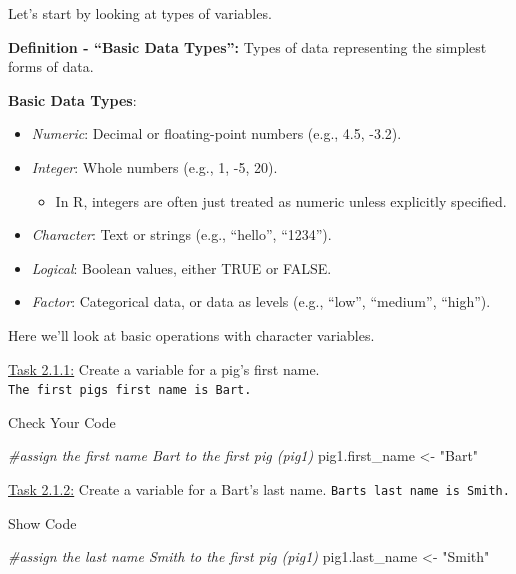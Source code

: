 \documentclass[
]{article}
\newenvironment{Shaded}{\begin{snugshade}}{\end{snugshade}}
\newcommand{\CommentTok}[1]{\textcolor[rgb]{0.56,0.35,0.01}{\textit{#1}}}
\newcommand{\NormalTok}[1]{#1}
\newcommand{\OtherTok}[1]{\textcolor[rgb]{0.56,0.35,0.01}{#1}}
\newcommand{\StringTok}[1]{\textcolor[rgb]{0.31,0.60,0.02}{#1}}
\providecommand{\tightlist}{%
  \setlength{\itemsep}{0pt}\setlength{\parskip}{0pt}}
\begin{document}
Let's start by looking at types of variables.

\textbf{Definition - ``Basic Data Types'':} Types of data representing
the simplest forms of data.

\textbf{Basic Data Types}:

\begin{itemize}
\tightlist
\item
  \emph{Numeric}: Decimal or floating-point numbers (e.g., 4.5, -3.2).
\item
  \emph{Integer}: Whole numbers (e.g., 1, -5, 20).

  \begin{itemize}
  \tightlist
  \item
    In R, integers are often just treated as numeric unless explicitly
    specified.
  \end{itemize}
\item
  \emph{Character}: Text or strings (e.g., ``hello'', ``1234'').
\item
  \emph{Logical}: Boolean values, either TRUE or FALSE.
\item
  \emph{Factor}: Categorical data, or data as levels (e.g., ``low'',
  ``medium'', ``high'').
\end{itemize}

Here we'll look at basic operations with character variables.

\ul{Task 2.1.1:} Create a variable for a pig's first name. \textbar{}
\texttt{The\ first\ pig\textquotesingle{}s\ first\ name\ is\ \textquotesingle{}Bart\textquotesingle{}.}

Check Your Code

\begin{Shaded}
\begin{Highlighting}[]
\CommentTok{\#assign the first name \textquotesingle{}Bart\textquotesingle{} to the first pig (pig1)}
\NormalTok{pig1.first\_name }\OtherTok{\textless{}{-}} \StringTok{"Bart"}
\end{Highlighting}
\end{Shaded}

\ul{Task 2.1.2:} Create a variable for a Bart's last name. \textbar{}
\texttt{Bart\textquotesingle{}s\ last\ name\ is\ \textquotesingle{}Smith\textquotesingle{}.}

Show Code

\begin{Shaded}
\begin{Highlighting}[]
\CommentTok{\#assign the last name \textquotesingle{}Smith\textquotesingle{} to the first pig (pig1)}
\NormalTok{pig1.last\_name }\OtherTok{\textless{}{-}} \StringTok{"Smith"}
\end{Highlighting}
\end{Shaded}
\end{document}
